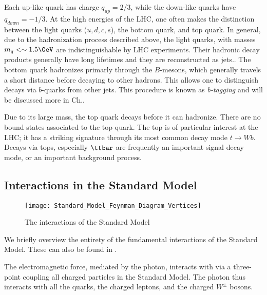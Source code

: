 Each up-like quark has charge $q_{up} = 2/3$, while the down-like quarks have $q_{down} = -1/3$.
At the high energies of the LHC, one often makes the distinction between the light quarks ($u,d,c,s$), the bottom quark, and top quark.
In general, due to the hadronization process described above, the light quarks, with masses $m_q <\order 1.5 \GeV$ are indistinguishable by LHC experiments.
Their hadronic decay products generally have long lifetimes and they are reconstructed as jets.\footnotemark.
The bottom quark hadronizes primarly through the $B$-mesons, which generally travels a short distance before decaying to other hadrons.
This allows one to distinguish decays via $b$-quarks from other jets.
This procedure is known as \textit{b-tagging} and will be discussed more in Ch..

Due to its large mass, the top quark decays before it can hadronize.
There are no bound states associated to the top quark.
The top is of particular interest at the LHC; it has a striking signature through its most common decay mode $t \rightarrow Wb$.
Decays via tops, especially $\ttbar$ are frequently an important signal decay mode, or an important background process.

\subsection{Interactions in the Standard Model}
\begin{figure}
\caption{The interactions of the Standard Model} \label{fig:sm_interactions}
\texttt{[image: Standard\_Model\_Feynman\_Diagram\_Vertices]}
\end{figure}

We briefly overview the entirety of the fundamental interactions of the Standard Model.
These can also be found in .

The electromagnetic force, mediated by the photon, interacts with via a three-point coupling all charged particles in the Standard Model.
The photon thus interacts with all the quarks, the charged leptons, and the charged $W^\pm$ bosons.

